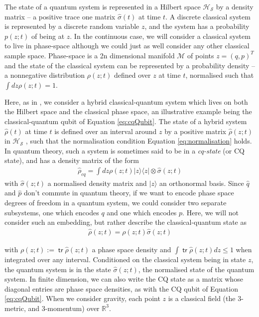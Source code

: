 \documentclass[aps,pra,showpacs,citeautoscript,amsmath,amssymb,floatfix,superscriptaddress,bbm, verbatim,amsfonts,changes,11pt,nofootinbib,longbibliography]{revtex4-2}
\newcommand{\tr}{\mathop{\mathsf{tr}}\nolimits}
\newcommand{\ket}[1]{|#1\rangle}
\newcommand{\proj}[1]{|#1\rangle\!\langle#1|}
\def\p{{\bf p}_{\vec k}}
\def\z{{z}}
\def\q{{q}}
\def\p{{p}}
\renewcommand{\varrho}{\hat{\rho}}
\def\cqstate{\varrho}
\def\psiz{{\varrho(\z;t)}}
\begin{document}
The state of a quantum system is represented in a Hilbert space $\mathcal{H_S}$ by a density matrix -- a positive trace one matrix $\hat{\sigma}(t)$ at time $t$.  A discrete %
classical system is represented by a discrete random variable $\z$, and the system has a probability $p(\z;t)$ of being at $\z$.  In the continuous case, we will consider a classical system to live in phase-space although we could just as well consider any other classical sample space. Phase-space is a 2n dimensional manifold ${\mathcal M}$ of points $\z=(\q,\p)^T$ and the state of the classical system can be represented by a probability density -- a nonnegative distribution %
 $\rho(\z;t)$ defined over $\z$ at time $t$, normalised such that $\int d\z \rho(\z;t)=1$.

Here, as in  \cite{aleksandrov1981statistical,gerasimenko1982dynamical, blanchard1993interaction,blanchard1995event,diosi1995quantum, diosi2014hybrid,alicki2003completely,poulinKITP}, we consider a hybrid classical-quantum system which lives on both the Hilbert space and the classical phase space, an illustrative example being the classical-quantum qubit of Equation \eqref{eq:cqQubit}. The state of a hybrid system $\cqstate(t)$ at time $t$ is defined over an interval around $\z$ by a positive  matrix $\cqstate(\z;t)$ in $\mathcal{H_S}$ \cite{barb_foot}, such that the normalisation condition Equation \eqref{eq:normalisation} holds. 
In quantum theory, such a system is sometimes said to be in a {\it cq-state} (or CQ state), and has a density matrix of the form %
\begin{align}
\varrho_{cq}=\int d\z\rho(\z;t)\proj{\z}\otimes\hat{\sigma}({\z;t})  
\label{eq:cq-state}
\end{align}
with $\hat{\sigma}(\z;t)$ a normalised density matrix and $\ket{\z}$ an orthonormal basis.
Since $\hat{q}$ and $\hat{p}$ don't commute in quantum theory, if we want to 
encode phase space degrees of freedom in a quantum system, we could consider two separate subsystems, one which encodes $q$ and one which encodes $p$.\label{ft:embed}
Here, we will not consider such an embedding, but rather describe the classical-quantum
 state as 
 \begin{align}
 \cqstate(\z;t)=\rho(\z;t)\hat{\sigma}(\z;t)
 \label{eq:cqRef3}
 \end{align}

with %
 $\rho(\z;t):=\tr\psiz$ a phase space density and $\int\tr\psiz d\z \leq 1$ when integrated over any interval.\label{par:subnormal} 
Conditioned on the classical system being in state $\z$, the quantum system is in the state $\hat{\sigma}(\z;t)$, the normalised state of the quantum system. In finite dimension, we can also write the CQ state as a matrix whose diagonal entries are phase space densities, as with the CQ qubit of Equation \eqref{eq:cqQubit}.
When we consider gravity,
each point $\z$ is a classical field (the 3-metric, and 3-momentum) over $\mathbb{R}^3$.
\end{document}

